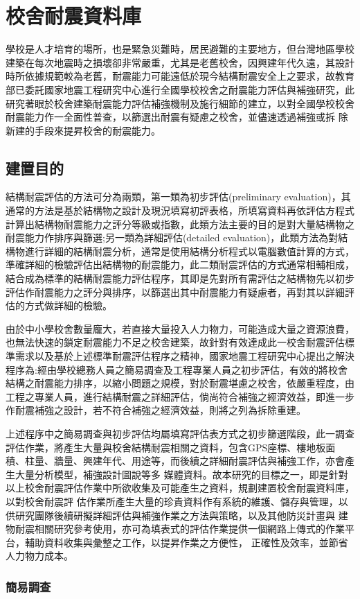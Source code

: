 \renewcommand\thetable{\arabic{chapter}-\arabic{table}}
\renewcommand{\theequation}{\arabic{chapter}-\arabic{equation}}
\chapter{校舍耐震資料庫}

學校是人才培育的場所，也是緊急災難時，居民避難的主要地方，但台灣地區學校建築在每次地震時之損壞卻非常嚴重，尤其是老舊校舍，因興建年代久遠，其設計時所依據規範較為老舊，耐震能力可能遠低於現今結構耐震安全上之要求，故教育部已委託國家地震工程研究中心進行全國學校校舍之耐震能力評估與補強研究，此研究著眼於校舍建築耐震能力評估補強機制及施行細節的建立，以對全國學校校舍耐震能力作一全面性普查，以篩選出耐震有疑慮之校舍，並儘速透過補強或拆 除新建的手段來提昇校舍的耐震能力。

\section{建置目的} 

結構耐震評估的方法可分為兩類，第一類為初步評估(preliminary evaluation)，其通常的方法是基於結構物之設計及現況填寫初評表格，所填寫資料再依評估方程式計算出結構物耐震能力之評分等級或指數，此類方法主要的目的是對大量結構物之耐震能力作排序與篩選;另一類為詳細評估(detailed evaluation)，此類方法為對結構物進行詳細的結構耐震分析，通常是使用結構分析程式以電腦數值計算的方式，準確詳細的檢驗評估出結構物的耐震能力，此二類耐震評估的方式通常相輔相成，結合成為標準的結構耐震能力評估程序，其即是先對所有需評估之結構物先以初步評估作耐震能力之評分與排序，以篩選出其中耐震能力有疑慮者，再對其以詳細評估的方式做詳細的檢驗。

由於中小學校舍數量龐大，若直接大量投入人力物力，可能造成大量之資源浪費，也無法快速的鎖定耐震能力不足之校舍建築，故針對有效達成此一校舍耐震評估標準需求以及基於上述標準耐震評估程序之精神，國家地震工程研究中心提出之解決程序為:經由學校總務人員之簡易調查及工程專業人員之初步評估，有效的將校舍結構之耐震能力排序，以縮小問題之規模，對於耐震堪慮之校舍，依嚴重程度，由工程之專業人員，進行結構耐震之詳細評估，倘尚符合補強之經濟效益，即進一步作耐震補強之設計，若不符合補強之經濟效益，則將之列為拆除重建。

上述程序中之簡易調查與初步評估均屬填寫評估表方式之初步篩選階段，此一調查評估作業，將產生大量與校舍結構耐震相關之資料，包含GPS座標、樓地板面積、柱量、牆量、興建年代、用途等，而後續之詳細耐震評估與補強工作，亦會產生大量分析模型，補強設計圖說等多 媒體資料。故本研究的目標之一，即是針對以上校舍耐震評估作業中所欲收集及可能產生之資料，規劃建置校舍耐震資料庫，以對校舍耐震評 估作業所產生大量的珍貴資料作有系統的維護、儲存與管理，以供研究團隊後續研擬詳細評估與補強作業之方法與策略，以及其他防災計畫與 建物耐震相關研究參考使用，亦可為填表式的評估作業提供一個網路上傳式的作業平台，輔助資料收集與彙整之工作，以提昇作業之方便性， 正確性及效率，並節省人力物力成本。

\subsection{簡易調查} 
